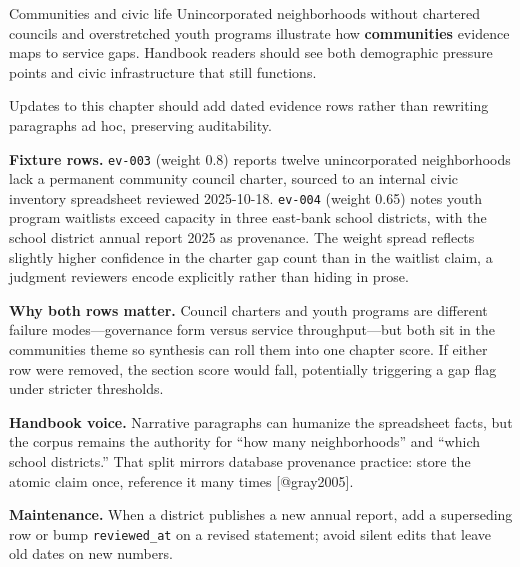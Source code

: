 \documentclass[
  ignorenonframetext,
]{beamer}
\author{\texorpdfstring{}{}}
\date{}
\begin{document}
\begin{frame}[fragile]{Communities and civic life}
\protect{}\label{communities-and-civic-life}
Unincorporated neighborhoods without chartered councils and
overstretched youth programs illustrate how \textbf{communities}
evidence maps to service gaps. Handbook readers should see both
demographic pressure points and civic infrastructure that still
functions.

Updates to this chapter should add dated evidence rows rather than
rewriting paragraphs ad hoc, preserving auditability.

\textbf{Fixture rows.} \texttt{ev-003} (weight 0.8) reports twelve
unincorporated neighborhoods lack a permanent community council charter,
sourced to an internal civic inventory spreadsheet reviewed 2025-10-18.
\texttt{ev-004} (weight 0.65) notes youth program waitlists exceed
capacity in three east-bank school districts, with the school district
annual report 2025 as provenance. The weight spread reflects slightly
higher confidence in the charter gap count than in the waitlist claim, a
judgment reviewers encode explicitly rather than hiding in prose.

\textbf{Why both rows matter.} Council charters and youth programs are
different failure modes---governance form versus service
throughput---but both sit in the communities theme so synthesis can roll
them into one chapter score. If either row were removed, the section
score would fall, potentially triggering a gap flag under stricter
thresholds.

\textbf{Handbook voice.} Narrative paragraphs can humanize the
spreadsheet facts, but the corpus remains the authority for ``how many
neighborhoods'' and ``which school districts.'' That split mirrors
database provenance practice: store the atomic claim once, reference it
many times {[}@gray2005{]}.

\textbf{Maintenance.} When a district publishes a new annual report, add
a superseding row or bump \texttt{reviewed\_at} on a revised statement;
avoid silent edits that leave old dates on new numbers.
\end{frame}
\end{document}
